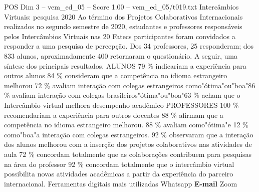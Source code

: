 \begin{textsample}{POS Dim 3 – vem\_ed\_05 – Score 1.00 – vem\_ed\_05/t019.txt}  \label{ex:f3_pos_040}
Intercâmbios Virtuais: pesquisa 2020 Ao término dos Projetos Colaborativos Internacionais realizados no segundo semestre de 2020, estudantes e professores responsáveis pelos Intercâmbios Virtuais nas 20 Fatecs participantes foram convidados a responder a uma pesquisa de percepção.
Dos 34 professores, 25 responderam; dos 833 alunos, aproximadamente 400 retornaram o questionário.
A seguir, uma síntese dos principais resultados.
ALUNOS 79 \% indicariam a experiência para outros alunos 84 \% consideram que a competência no idioma estrangeiro melhorou 72 \% avaliam interação com colegas estrangeiros como"ótima"ou"boa"86 \% avaliam interação com colegas brasileiros"ótima"ou"boa"63 \% acham que o Intercâmbio virtual melhora desempenho acadêmico PROFESSORES 100 \% recomendariam a experiência para outros docentes 88 \% afirmam que a competência no idioma estrangeiro melhorou. 88 \% avaliam como"ótima"e 12 \% como"boa"a interação com colegas estrangeiros. 92 \% observaram que a interação dos alunos melhorou com a inserção dos projetos colaborativos nas atividades de aula 72 \% concordam totalmente que as colaborações contribuem para pesquisas na área do professor 92 \% concordam totalmente que o intercâmbio virtual possibilita novas atividades acadêmicas a partir da experiência do parceiro internacional.
Ferramentas digitais mais utilizadas Whatsapp \textbf{E-mail} Zoom

\end{textsample}
